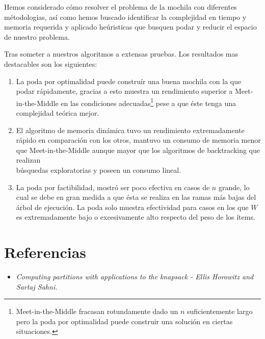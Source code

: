 \documentclass[fleqn, 11pt]{article}
\begin{document}
Hemos considerado cómo resolver el problema de la mochila con diferentes
métodologias, así como hemos buscado identificar la complejidad en tiempo y
memoria requerida y aplicado heúristicas que busquen podar y reducir el espacio
de nuestro problema.

Tras someter a nuestros algoritmos a extensas pruebas. Los resultados mas
destacables son los siguientes:

\begin{enumerate}
	\item La poda por optimalidad puede construír una buena mochila con la
	que podar rápidamente, gracias a esto muestra un rendimiento superior a
	Meet-in-the-Middle en las condiciones
	adecuadas\footnote{Meet-in-the-Middle fracasan rotundamente dado un $n$
	suficientemente largo pero la poda por optimalidad puede construir una
	solución en ciertas situaciones.} pese a que éste tenga una complejidad
	teórica mejor.

	\item El algoritmo de memoria dinámica tuvo un rendimiento
	extremadamente rápido en comparación con los otros, mantuvo un consumo
	de memoria menor que Meet-in-the-Middle aunque mayor que los algoritmos
	de backtracking que realizan\\búsquedas exploratorias y poseen un
	consumo lineal.
	
	\item La poda por factibilidad, mostró ser poco efectiva en casos de
	$n$ grande, lo cual se debe en gran medida a que ésta se realiza en las
	ramas más bajas del árbol de ejecución. La poda solo muestra
	efectividad para casos en los que $W$ es extremadamente bajo o
	excesivamente alto respecto del peso de los ítems.
\end{enumerate}

\section{Referencias}
\begin{itemize}
	\item[] \textit{Computing partitions with applications to the knapsack
	- Ellis Horowitz and Sartaj Sahni.}
\end{itemize}
\end{document}
